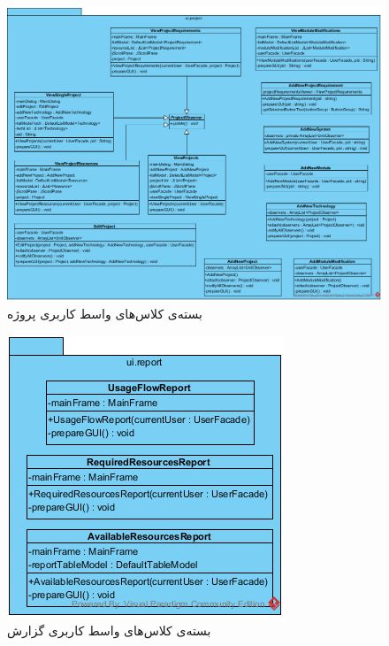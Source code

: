 \begin{figure}[H]
	\centering
	\includegraphics[width=\textwidth]{img/class-design/ui/UIProject}

	\caption{بسته‌ی کلاس‌های واسط کاربری پروژه}
\end{figure}

\begin{figure}[H]
	\centering
	\includegraphics[width=\textwidth]{img/class-design/ui/UIReport}

	\caption{بسته‌ی کلاس‌های واسط کاربری گزارش}
\end{figure}

